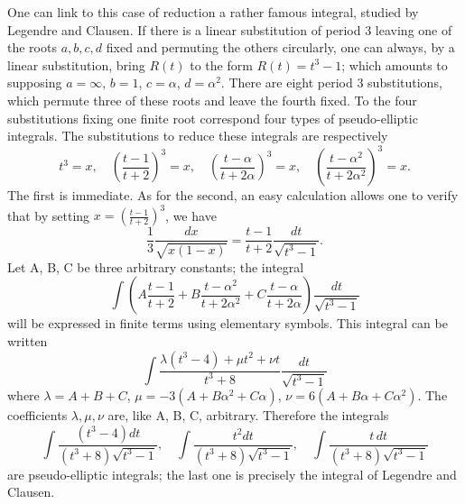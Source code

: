 \documentclass[11pt]{article}
\begin{document}
One can link to this case of reduction a rather famous integral, studied by Legendre and Clausen. If there is a linear substitution of period 3 leaving one of the roots $a, b, c, d$ fixed and permuting the others circularly, one can always, by a linear substitution, bring $R(t)$ to the form $R(t)=t^{3}-1$; which amounts to supposing $a=\infty$, $b=1$, $c=\alpha$, $d=\alpha^{2}$. There are eight period 3 substitutions, which permute three of these roots and leave the fourth fixed. To the four substitutions fixing one finite root correspond four types of pseudo-elliptic integrals. The substitutions to reduce these integrals are respectively
\begin{equation*}
t^{3}=x, \quad \left(\frac{t-1}{t+2}\right)^{3}=x, \quad \left(\frac{t-\alpha}{t+2\alpha}\right)^{3}=x, \quad \left(\frac{t-\alpha^{2}}{t+2\alpha^{2}}\right)^{3}=x.
\end{equation*}
The first is immediate. As for the second, an easy calculation allows one to verify that by setting $x=\left(\frac{t-1}{t+2}\right)^{3}$, we have
\begin{equation*}
\frac{1}{3}\frac{dx}{\sqrt{x(1-x)}}=\frac{t-1}{t+2}\frac{dt}{\sqrt{t^{3}-1}}.
\end{equation*}
Let A, B, C be three arbitrary constants; the integral
\begin{equation*}
\int\left(A\frac{t-1}{t+2}+B\frac{t-\alpha^{2}}{t+2\alpha^{2}}+C\frac{t-\alpha}{t+2\alpha}\right)\frac{dt}{\sqrt{t^{3}-1}}
\end{equation*}
will be expressed in finite terms using elementary symbols. This integral can be written
\begin{equation*}
\int\frac{\lambda(t^{3}-4)+\mu t^{2}+\nu t}{t^{3}+8}\frac{dt}{\sqrt{t^{3}-1}}
\end{equation*}
where $\lambda=A+B+C$, $\mu=-3(A+B\alpha^{2}+C\alpha)$, $\nu=6(A+B\alpha+C\alpha^{2})$. The coefficients $\lambda, \mu, \nu$ are, like A, B, C, arbitrary. Therefore the integrals
\begin{equation*}
\int\frac{(t^{3}-4)dt}{(t^{3}+8)\sqrt{t^{3}-1}}, \quad \int\frac{t^2 dt}{(t^{3}+8)\sqrt{t^{3}-1}}, \quad \int\frac{t\,dt}{(t^{3}+8)\sqrt{t^{3}-1}}
\end{equation*}
are pseudo-elliptic integrals; the last one is precisely the integral of Legendre and Clausen.
\end{document}
